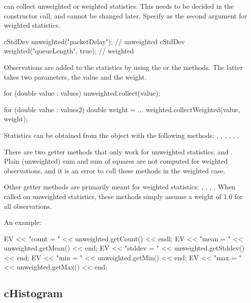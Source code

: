  can collect unweighted or weighted statistics. This needs
to be decided in the constructor call, and cannot be changed later.
Specify  as the second argument for weighted statistics.

\begin{cpp}
cStdDev unweighted("packetDelay");  // unweighted
cStdDev weighted("queueLength", true); // weighted
\end{cpp}

Observations are added to the statistics by using the 
or the  methods. The latter takes two parameters,
the value and the weight.

\begin{cpp}
for (double value : values)
    unweighted.collect(value);

for (double value : values2) {
    double weight = ...
    weighted.collectWeighted(value, weight);
}
\end{cpp}

Statistics can be obtained from the object with the following methods:
, , , ,
, .

There are two getter methods that only work for unweighted statistics:
 and . Plain (unweighted) sum and
sum of squares are not computed for weighted observations, and it is
an error to call these methods in the weighted case.

Other getter methods are primarily meant for weighted statistics:
, ,
, .
When called on unweighted statistics, these methods simply
assume a weight of 1.0 for all observations.

An example:

\begin{cpp}
EV << "count = " << unweighted.getCount() << endl;
EV << "mean = " << unweighted.getMean() << end;
EV << "stddev = " << unweighted.getStddev() << end;
EV << "min = " << unweighted.getMin() << end;
EV << "max = " << unweighted.getMax() << end;
\end{cpp}


\subsection{cHistogram}
\label{sec:sim-lib:histograms}

